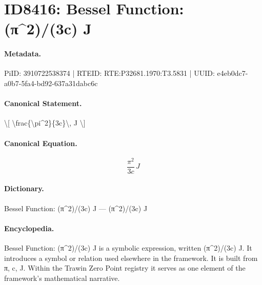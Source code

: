 \section*{ID8416: Bessel Function: (π\textasciicircum{}2)/(3c) J}
\paragraph{Metadata.}
PiID: 3910722538374 | RTEID: RTE:P32681.1970:T3.5831 | UUID: e4eb0dc7-a0b7-5fa4-bd92-637a31dabc6c

\paragraph{Canonical Statement.}
\textbackslash{}[ \textbackslash{}frac\{\textbackslash{}pi\textasciicircum{}2\}\{3c\}\textbackslash{}, J \textbackslash{}]

\paragraph{Canonical Equation.}
\[
\frac{\pi^2}{3c}\, J
\]

\paragraph{Dictionary.}
Bessel Function: (π\textasciicircum{}2)/(3c) J — (π\textasciicircum{}2)/(3c) J

\paragraph{Encyclopedia.}
Bessel Function: (π\textasciicircum{}2)/(3c) J is a symbolic expression, written (π\textasciicircum{}2)/(3c) J. It introduces a symbol or relation used elsewhere in the framework. It is built from π, c, J. Within the Trawin Zero Point registry it serves as one element of the framework's mathematical narrative.
